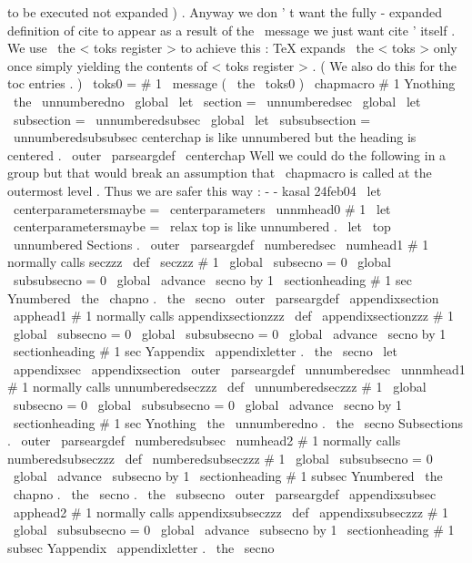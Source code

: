 {{%
to
be
executed
not
expanded
)
.
%
%
Anyway
we
don
'
t
want
the
fully
-
expanded
definition
of
cite
to
appear
%
as
a
result
of
the
\
message
we
just
want
cite
'
itself
.
We
use
%
\
the
<
toks
register
>
to
achieve
this
:
TeX
expands
\
the
<
toks
>
only
once
%
simply
yielding
the
contents
of
<
toks
register
>
.
(
We
also
do
this
for
%
the
toc
entries
.
)
\
toks0
=
{
#
1
}
%
\
message
{
(
\
the
\
toks0
)
}
%
%
\
chapmacro
{
#
1
}
{
Ynothing
}
{
\
the
\
unnumberedno
}
%
%
\
global
\
let
\
section
=
\
unnumberedsec
\
global
\
let
\
subsection
=
\
unnumberedsubsec
\
global
\
let
\
subsubsection
=
\
unnumberedsubsubsec
}
%
centerchap
is
like
unnumbered
but
the
heading
is
centered
.
\
outer
\
parseargdef
\
centerchap
{
%
%
Well
we
could
do
the
following
in
a
group
but
that
would
break
%
an
assumption
that
\
chapmacro
is
called
at
the
outermost
level
.
%
Thus
we
are
safer
this
way
:
-
-
kasal
24feb04
\
let
\
centerparametersmaybe
=
\
centerparameters
\
unnmhead0
{
#
1
}
%
\
let
\
centerparametersmaybe
=
\
relax
}
%
top
is
like
unnumbered
.
\
let
\
top
\
unnumbered
%
Sections
.
\
outer
\
parseargdef
\
numberedsec
{
\
numhead1
{
#
1
}
}
%
normally
calls
seczzz
\
def
\
seczzz
#
1
{
%
\
global
\
subsecno
=
0
\
global
\
subsubsecno
=
0
\
global
\
advance
\
secno
by
1
\
sectionheading
{
#
1
}
{
sec
}
{
Ynumbered
}
{
\
the
\
chapno
.
\
the
\
secno
}
%
}
\
outer
\
parseargdef
\
appendixsection
{
\
apphead1
{
#
1
}
}
%
normally
calls
appendixsectionzzz
\
def
\
appendixsectionzzz
#
1
{
%
\
global
\
subsecno
=
0
\
global
\
subsubsecno
=
0
\
global
\
advance
\
secno
by
1
\
sectionheading
{
#
1
}
{
sec
}
{
Yappendix
}
{
\
appendixletter
.
\
the
\
secno
}
%
}
\
let
\
appendixsec
\
appendixsection
\
outer
\
parseargdef
\
unnumberedsec
{
\
unnmhead1
{
#
1
}
}
%
normally
calls
unnumberedseczzz
\
def
\
unnumberedseczzz
#
1
{
%
\
global
\
subsecno
=
0
\
global
\
subsubsecno
=
0
\
global
\
advance
\
secno
by
1
\
sectionheading
{
#
1
}
{
sec
}
{
Ynothing
}
{
\
the
\
unnumberedno
.
\
the
\
secno
}
%
}
%
Subsections
.
\
outer
\
parseargdef
\
numberedsubsec
{
\
numhead2
{
#
1
}
}
%
normally
calls
numberedsubseczzz
\
def
\
numberedsubseczzz
#
1
{
%
\
global
\
subsubsecno
=
0
\
global
\
advance
\
subsecno
by
1
\
sectionheading
{
#
1
}
{
subsec
}
{
Ynumbered
}
{
\
the
\
chapno
.
\
the
\
secno
.
\
the
\
subsecno
}
%
}
\
outer
\
parseargdef
\
appendixsubsec
{
\
apphead2
{
#
1
}
}
%
normally
calls
appendixsubseczzz
\
def
\
appendixsubseczzz
#
1
{
%
\
global
\
subsubsecno
=
0
\
global
\
advance
\
subsecno
by
1
\
sectionheading
{
#
1
}
{
subsec
}
{
Yappendix
}
%
{
\
appendixletter
.
\
the
\
secno
}}}
